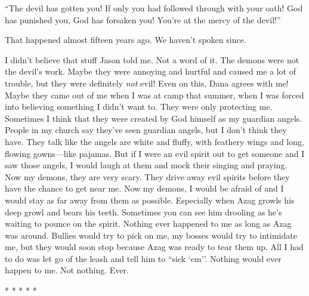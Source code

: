 ``The devil has gotten you! If only you had followed through with your
oath! God has punished you, God has forsaken you! You're at the mercy of
the devil!''

That happened almost fifteen years ago. We haven't spoken since.

I didn't believe that stuff Jason told me. Not a word of it. The demons
were not the devil's work. Maybe they were annoying and hurtful and
caused me a lot of trouble, but they were definitely \emph{not} evil!
Even on this, Dana agrees with me! Maybe they came out of me when I was
at camp that summer, when I was forced into believing something I didn't
want to. They were only protecting me. Sometimes I think that they were
created by God himself as my guardian angels. People in my church say
they've seen guardian angels, but I don't think they have. They talk
like the angels are white and fluffy, with feathery wings and long,
flowing gowns---like pajamas. But if I were an evil spirit out to get
someone and I saw those angels, I would laugh at them and mock their
singing and praying. Now my demons, they are very scary. They drive away
evil spirits before they have the chance to get near me. Now my demons,
I would be afraid of and I would stay as far away from them as possible.
Especially when Azag growls his deep growl and bears his teeth.
Sometimes you can see him drooling as he's waiting to pounce on the
spirit. Nothing ever happened to me as long as Azag was around. Bullies
would try to pick on me, my bosses would try to intimidate me, but they
would soon stop because Azag was ready to tear them up. All I had to do
was let go of the leash and tell him to ``sick `em''. Nothing would ever
happen to me. Not nothing. Ever.

* * * * *

